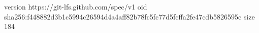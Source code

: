 version https://git-lfs.github.com/spec/v1
oid sha256:f448882d3b1c5994c26594d4a4aff82b78fc5fc77d5fcffa2fe47cdb5826595c
size 184
